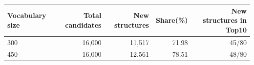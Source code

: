 \begin{tabular*}{\linewidth}{@{\extracolsep{\fill}}lrrrr@{}}\toprule
Vocabulary size & Total candidates & New structures & Share(\%) & New structures in Top10\\\midrule
300 & 16,000 & 11,517 & 71.98 & 45/80\\
450 & 16,000 & 12,561 & 78.51 & 48/80\\
\bottomrule\end{tabular*}